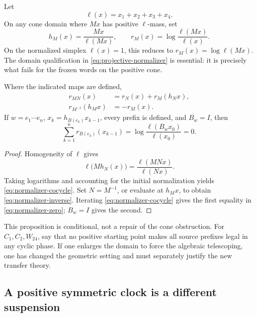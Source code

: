 Let
\[
 \ell(x)=x_1+x_2+x_3+x_4.
\]
On any cone domain where $Mx$ has positive $\ell$-mass, set
\begin{equation}
 h_M(x)=\frac{Mx}{\ell(Mx)},\qquad
 r_M(x)=\log\frac{\ell(Mx)}{\ell(x)}.
 \label{eq:projective-normalizer}
\end{equation}
On the normalized simplex $\ell(x)=1$, this reduces to
$r_M(x)=\log\ell(Mx)$.  The domain qualification in
\eqref{eq:projective-normalizer} is essential: it is precisely what fails for
the frozen words on the positive cone.

\begin{proposition}
\label{prop:normalizer-telescoping}
Where the indicated maps are defined,
\begin{align}
 r_{MN}(x)&=r_N(x)+r_M(h_Nx),
 \label{eq:normalizer-cocycle}\\
 r_{M^{-1}}(h_Mx)&=-r_M(x).
 \label{eq:normalizer-inverse}
\end{align}
If $w=e_1\cdots e_n$, $x_k=h_{B(e_k)}x_{k-1}$, every prefix is defined, and
$B_w=I$, then
\begin{equation}
 \sum_{k=1}^{n}r_{B(e_k)}(x_{k-1})
 =\log\frac{\ell(B_wx_0)}{\ell(x_0)}=0.
 \label{eq:normalizer-zero}
\end{equation}
\end{proposition}

\begin{proof}
Homogeneity of $\ell$ gives
\[
 \ell\bigl(Mh_N(x)\bigr)=\frac{\ell(MNx)}{\ell(Nx)}.
\]
Taking logarithms and accounting for the initial normalization yields
\eqref{eq:normalizer-cocycle}.  Set $N=M^{-1}$, or evaluate at $h_Mx$, to
obtain \eqref{eq:normalizer-inverse}.  Iterating
\eqref{eq:normalizer-cocycle} gives the first equality in
\eqref{eq:normalizer-zero}; $B_w=I$ gives the second.
\end{proof}

This proposition is conditional, not a repair of the cone obstruction.  For
$C_1,C_2,W_{24}$,
 say that no
positive starting point makes all source prefixes legal in any cyclic phase.
If one enlarges the domain to force the algebraic telescoping, one has changed
the geometric setting and must separately justify the new transfer theory.

\subsection{A positive symmetric clock is a different suspension}


